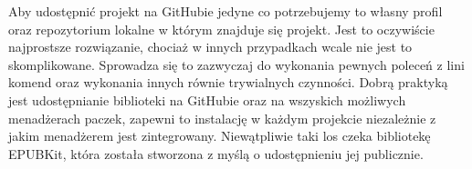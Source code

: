 Aby udostępnić projekt na GitHubie jedyne co potrzebujemy to własny profil oraz repozytorium lokalne w którym znajduje się projekt. Jest to oczywiście najprostsze rozwiązanie, chociaż w innych przypadkach wcale nie jest to skomplikowane. Sprowadza się to zazwyczaj do wykonania pewnych poleceń z lini komend oraz wykonania innych równie trywialnych czynności. Dobrą praktyką jest udostępnianie biblioteki na GitHubie oraz na wszyskich możliwych menadżerach paczek, zapewni to instalację w każdym projekcie niezależnie z jakim menadżerem jest zintegrowany. Niewątpliwie taki los czeka bibliotekę EPUBKit, która została stworzona z myślą o udostępnieniu jej publicznie.
